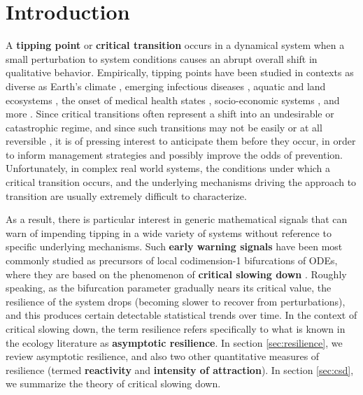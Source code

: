 
\section{Introduction}
\label{sec:intro}

A \textbf{tipping point} or \textbf{critical transition} occurs in a dynamical system when a small perturbation to system conditions causes an abrupt overall shift in qualitative behavior. 
%
Empirically, tipping points have been studied in contexts as diverse as
Earth's climate \cite{lentonTippingElementsEarth2008, dakosSlowingEarlyWarning2008a}, 
emerging infectious diseases \cite{brettDynamicalFootprintsEnable2020}, 
aquatic and land ecosystems \cite{schefferCatastrophicShiftsEcosystems2001a, carpenterRisingVarianceLeading2006}, 
the onset of medical health states \cite{mcsharryPredictionEpilepticSeizures2003, venegasSelforganizedPatchinessAsthma2005}, 
socio-economic systems \cite{ginkelClimateChangeInduced2020}, 
and more \cite{georgeEarlyWarningSignals2021, schefferEarlywarningSignalsCritical2009a}. 
%
Since critical transitions often represent a shift into an undesirable or catastrophic regime, and since such transitions may not be easily or at all reversible \cite{albrichClimateChangeCauses2020, chenImperfectVaccineHysteresis2019, lucariniThermodynamicAnalysisSnowball2010}, it is of pressing interest to anticipate them before they occur, in order to inform management strategies and possibly improve the odds of prevention. Unfortunately, in complex real world systems, the conditions under which a critical transition occurs, and the underlying mechanisms driving the approach to transition are usually extremely difficult to characterize.

As a result, there is particular interest in generic mathematical signals that can warn of impending tipping in a wide variety of systems without reference to specific underlying mechanisms. Such \textbf{early warning signals} have been most commonly studied as precursors of local codimension-1 bifurcations of ODEs, where they are based on the phenomenon of \textbf{critical slowing down} \cite{schefferEarlywarningSignalsCritical2009a}. Roughly speaking, as the bifurcation parameter gradually nears its critical value, the resilience of the system drops (becoming slower to recover from perturbations), and this produces certain detectable statistical trends over time. In the context of critical slowing down, the term resilience refers specifically to what is known in the ecology literature as \textbf{asymptotic resilience}. In section \ref{sec:resilience}, we review asymptotic resilience, and also two other quantitative measures of resilience (termed \textbf{reactivity} and \textbf{intensity of attraction}). In section \ref{sec:csd}, we summarize the theory of critical slowing down. 

